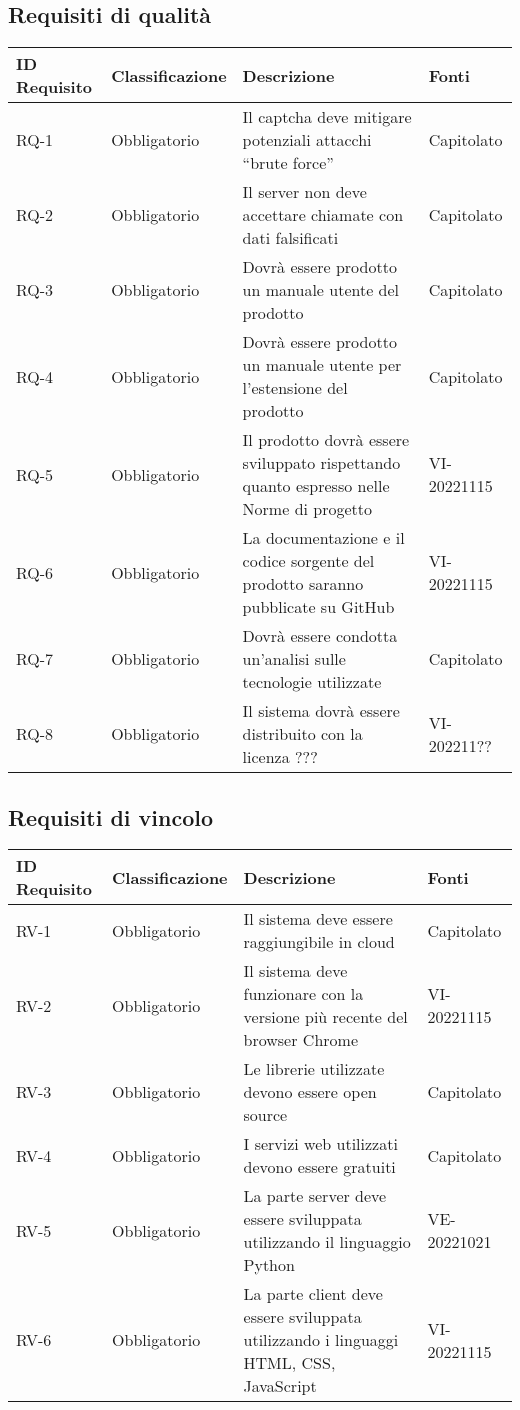 \subsection{Requisiti di qualità}
\begin{tabular}{| p{} | p{} | p{} | p{} |} 
 \hline
 \textbf{ID Requisito} & \textbf{Classificazione} & \textbf{Descrizione} & \textbf{Fonti} \\
 \hline
 RQ-1 & Obbligatorio &  Il captcha deve mitigare potenziali attacchi “brute force” & Capitolato\\
 \hline
  RQ-2 & Obbligatorio & Il server non deve accettare chiamate con dati falsificati & Capitolato\\
 \hline
 RQ-3 & Obbligatorio &  Dovrà essere prodotto un manuale utente del prodotto & Capitolato\\
 \hline
 RQ-4 & Obbligatorio &  Dovrà essere prodotto un manuale utente per l'estensione del prodotto &  Capitolato\\
 \hline
 RQ-5 & Obbligatorio & Il prodotto dovrà essere sviluppato rispettando quanto espresso nelle Norme di progetto & VI-20221115\\
 \hline
 RQ-6 & Obbligatorio &  La documentazione e il codice sorgente del prodotto saranno pubblicate su GitHub & VI-20221115\\
 \hline
 RQ-7 & Obbligatorio & Dovrà essere condotta un'analisi sulle tecnologie utilizzate & Capitolato\\
 \hline
 RQ-8 & Obbligatorio &  Il sistema dovrà essere distribuito con la licenza ??? & VI-202211??\\
 \hline
\end{tabular}

\subsection{Requisiti di vincolo}
\begin{tabular}{| p{} | p{} | p{} | p{} |} 
 \hline
 \textbf{ID Requisito} & \textbf{Classificazione} & \textbf{Descrizione} & \textbf{Fonti} \\
 \hline
 RV-1 & Obbligatorio &  Il sistema deve essere raggiungibile in cloud & Capitolato\\
 \hline
  RV-2 & Obbligatorio & Il sistema deve funzionare con la versione più recente del browser Chrome & VI-20221115\\
 \hline
 RV-3 & Obbligatorio &  Le librerie utilizzate devono essere open source & Capitolato\\
 \hline
 RV-4 & Obbligatorio & I servizi web utilizzati devono essere gratuiti &  Capitolato\\
 \hline
 RV-5 & Obbligatorio & La parte server deve essere sviluppata utilizzando il linguaggio Python & VE-20221021\\
 \hline
 RV-6 & Obbligatorio & La parte client deve essere sviluppata utilizzando i linguaggi HTML, CSS, JavaScript & VI-20221115\\
 \hline
\end{tabular}

